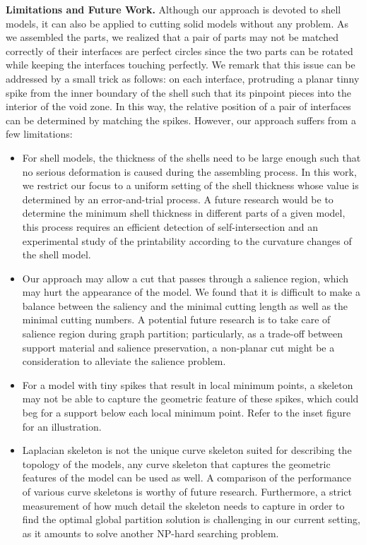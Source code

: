 \textbf{Limitations and Future Work.} Although our approach is devoted to shell models, it can also be applied to cutting solid models without any problem. As we assembled the parts, we realized that a pair of parts may not be matched correctly of their interfaces are perfect circles since the two parts can be rotated while keeping the interfaces touching perfectly. We remark that this issue can be addressed by a small trick as follows: on each interface, protruding a planar tinny spike from the inner boundary of the shell such that its pinpoint pieces into the interior of the void zone. In this way, the relative position of a pair of interfaces can be determined by matching the spikes. However, our approach suffers from a few limitations:
\begin{itemize}
 \item  For shell models, the thickness of the shells need to be large enough such that no serious deformation is caused during the assembling process. In this work, we restrict our focus to a uniform setting of the shell thickness whose value is determined by an error-and-trial process. A future research would be to determine the minimum shell thickness in different parts of a given model, this process requires an efficient detection of self-intersection and an experimental study of the printability according to the curvature changes of the shell model.
 \item  Our approach may allow a cut that passes through a salience region, which may hurt the appearance of the model. We found that it is difficult to make a balance between the saliency and the minimal cutting length as well as the minimal cutting numbers. A potential future research is to take care of salience region during graph partition; particularly, as a trade-off between support material and salience preservation, a non-planar cut might be a consideration to alleviate the salience problem.
 \item  For a model with tiny spikes that result in local minimum points, a skeleton may not be able to capture the geometric feature of these spikes, which could beg for a support below each local minimum point. Refer to the inset figure for an illustration.
 \item  Laplacian skeleton is not the unique curve skeleton suited for describing the topology of the models, any curve skeleton that captures the geometric features of the model can be used as well. A comparison of the performance of various curve skeletons is worthy of future research. Furthermore, a strict measurement of how much detail the skeleton needs to capture in order to find the optimal global partition solution is challenging in our current setting, as it amounts to solve another NP-hard searching problem.

\end{itemize}
